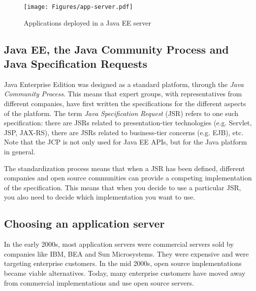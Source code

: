 \begin{figure}[]
	\centering
    \texttt{[image: Figures/app-server.pdf]}
	\caption{Applications deployed in a Java EE server}
  \label{fig:app-server}
\end{figure}

\subsection{Java EE, the Java Community Process and Java Specification Requests}


Java Enterprise Edition was designed as a standard platform, through the \emph{Java Community Process}. This means that expert groups, with representatives from different companies, have first written the specifications for the different aspects of the platform. The term \emph{Java Specification Request} (JSR) refers to one such specification: there are JSRs related to presentation-tier technologies (e.g. Servlet, JSP, JAX-RS), there are JSRs related to business-tier concerns (e.g. EJB), etc. Note that the JCP is not only used for Java EE APIs, but for the Java platform in general.


The standardization process means that when a JSR has been defined, different companies and open source communities can provide a competing implementation of the specification. This means that when you decide to use a particular JSR, you also need to decide which implementation you want to use.
 
\subsection{Choosing an application server}

In the early 2000s, most application servers were commercial servers sold by companies like IBM, BEA and Sun Microsystems. They were expensive and were targeting enterprise customers. In the mid 2000s, open source implementations became viable alternatives. Today, many enterprise customers have moved away from commercial implementations and use open source servers.

